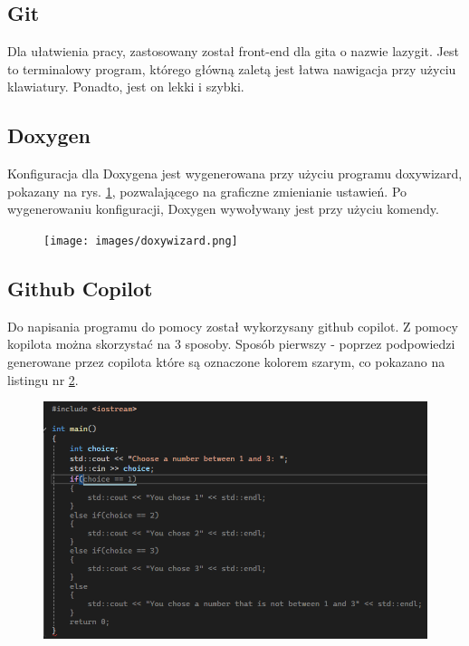 \subsection{Git}

Dla ułatwienia pracy, zastosowany został front-end dla gita o nazwie lazygit. Jest to terminalowy program, którego główną zaletą jest łatwa nawigacja przy użyciu klawiatury. Ponadto, jest on lekki i szybki.

\subsection{Doxygen}

Konfiguracja dla Doxygena jest wygenerowana przy użyciu programu doxywizard, pokazany na rys. \ref{fig:doxywizard}, pozwalającego na graficzne zmienianie ustawień. Po wygenerowaniu konfiguracji, Doxygen wywoływany jest przy użyciu komendy.

\begin{figure}[H]
	\centering
	\texttt{[image: images/doxywizard.png]}
	\caption{}
	\label{fig:doxywizard}
\end{figure}

\subsection{Github Copilot}
Do napisania programu do pomocy został wykorzysany github copilot. Z pomocy kopilota można skorzystać na 3 sposoby. Sposób pierwszy - poprzez podpowiedzi generowane przez copilota które są oznaczone kolorem szarym, co pokazano na listingu nr \ref{fig:copilotsuggestion}.

\begin{figure}[H]
	\centering
	\includegraphics[width=1\linewidth]{images/CopilotSuggestion}
	\caption{}
	\label{fig:copilotsuggestion}
\end{figure}

